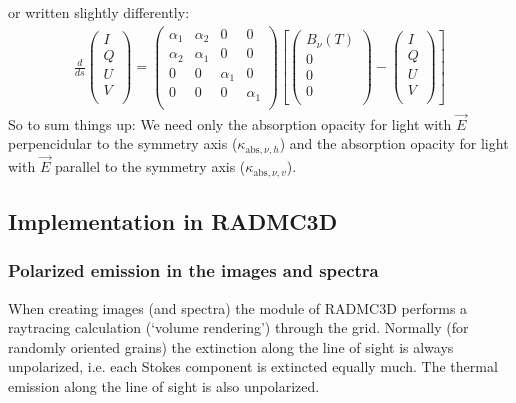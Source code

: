 \documentclass[letterpaper,10pt,english]{sphinxmanual}
\begin{document}
or written slightly differently:
\begin{equation*}
\begin{split}\frac{d}{ds}
\left(\begin{matrix}
I \\
Q \\
U \\
V \\
\end{matrix}\right)
=
\left(\begin{matrix}
\alpha_1 & \alpha_2 & 0 & 0 \\
\alpha_2 & \alpha_1 & 0 & 0  \\
0 & 0 & \alpha_1 & 0 \\
0 & 0 & 0 & \alpha_1 \\
\end{matrix}\right)
\left[
\left(\begin{matrix}
B_\nu(T) \\
0 \\
0 \\
0 \\
\end{matrix}\right)
-\left(\begin{matrix}
I \\
Q \\
U \\
V \\
\end{matrix}\right)\right]\end{split}
\end{equation*}
So to sum things up: We need only the absorption opacity for light with
\(\vec E\) perpencidular to the symmetry axis
(\(\kappa_{\mathrm{abs},\nu,h}\)) and the absorption opacity for light with
\(\vec E\) parallel to the symmetry axis
(\(\kappa_{\mathrm{abs},\nu,v}\)).


\subsection{Implementation in RADMC\sphinxhyphen{}3D}
\label{\detokenize{dustradtrans:implementation-in-radmc-3d}}

\subsubsection{Polarized emission in the images and spectra}
\label{\detokenize{dustradtrans:polarized-emission-in-the-images-and-spectra}}
When creating images (and spectra) the  module of RADMC\sphinxhyphen{}3D
performs a ray\sphinxhyphen{}tracing calculation (‘volume rendering’) through the grid.
Normally (for randomly oriented grains) the extinction along the line of
sight is always unpolarized, i.e. each Stokes component is extincted
equally much. The thermal emission along the line of sight is also
unpolarized.
\end{document}
